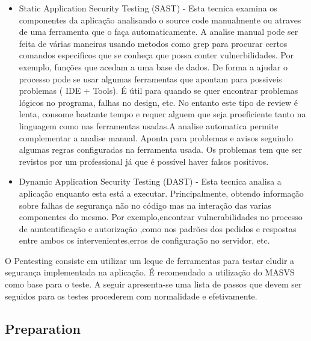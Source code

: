 \begin{itemize}

\item Static Application Security Testing (SAST) - Esta tecnica examina os componentes da aplicação analisando o source code manualmente ou atraves de uma ferramenta que o faça automaticamente. A analise manual pode ser feita de várias maneiras usando metodos como grep para procurar certos comandos especificos que se conheça que possa conter vulnerbilidades. Por exemplo, funções que acedam a uma base de dados. De forma a ajudar o processo pode se usar algumas ferramentas que apontam para possiveis problemas ( IDE + Tools). É útil para quando se quer encontrar problemas lógicos no programa, falhas no design, etc. No entanto este tipo de review é lenta, consome bastante tempo e requer alguem que seja proeficiente tanto na linguagem como nas ferramentas usadas.A analise automatica permite complementar a analise manual. Aponta para problemas e avisos seguindo algumas regras configuradas na ferramenta usada. Os problemas tem que ser revistos por um professional já que é possível haver falsos positivos.

\item Dynamic Application Security Testing (DAST) - Esta tecnica analisa a aplicação enquanto esta está a executar. Principalmente, obtendo informação sobre falhas de segurança não no código mas na interação das varias componentes do mesmo. Por exemplo,encontrar vulnerabilidades no processo de auntentificação e autorização ,como nos padrões dos pedidos e respostas entre ambos os intervenientes,erros de configuração no servidor, etc.


\end{itemize}

O Pentesting consiste em utilizar um leque de ferramentas para testar eludir a segurança implementada na aplicação. É recomendado a utilização do MASVS como base para o teste. A seguir apresenta-se uma lista de passos que devem ser seguidos para os testes procederem com normalidade e efetivamente.

\subsection{Preparation}

